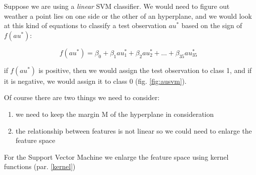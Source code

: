 Suppose we are using a \textit{linear} SVM classifier. We would need to figure out weather a point lies on one side or the other of an hyperplane, and we would look at this kind of equations to classify a test observation $au^*$ based on the sign of $f(au^*)$:

\begin{equation} 
	f(au^*) = \beta_0 + \beta_1 au^*_{1} + \beta_2 au^*_{2} + \dots + \beta_{35} au^*_{35}
\end{equation}

if $f(au^*)$ is positive, then we would assign the test observation to class 1, and if it is negative, we would assign it to class 0 (fig. \ref{fig:ausvm}).

Of course there are two things we need to consider:
\begin{enumerate}
	\item we need to keep the margin M of the hyperplane in consideration
	\item the relationship between features is not linear so we could need to enlarge the feature space
\end{enumerate}

For the Support Vector Machine we enlarge the feature space using kernel functions (par. \ref{kernel})





